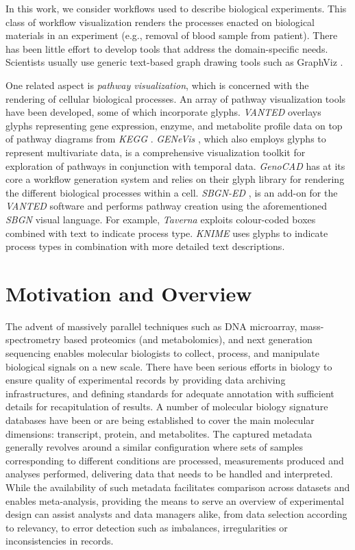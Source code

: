 In this work, we consider workflows used to describe biological experiments. 
This class of workflow visualization renders the processes enacted on biological materials in an experiment (e.g., removal of blood sample from patient).
There has been little effort to develop tools that address the domain-specific needs.
Scientists usually use generic text-based graph drawing tools such as GraphViz \cite{GraphViz::2012}.

One related aspect is \emph{pathway visualization}, which is concerned with the rendering of cellular biological processes.
An array of pathway visualization tools have been developed, some of which incorporate glyphs.
\emph{VANTED} \cite{junker06} overlays glyphs representing gene expression, enzyme, and metabolite profile data on top of pathway diagrams from \emph{KEGG} \cite{ogata99}.
\emph{GENeVis} \cite{bourqui09}, which also employs glyphs to represent multivariate data, is a comprehensive visualization toolkit for exploration of pathways in conjunction with temporal data.
\emph{GenoCAD} \cite{cai10}  has at its core a workflow generation system and relies on their glyph library for rendering the different biological processes within a cell.
\emph{SBGN-ED} \cite{czauderna10}, is an add-on for the \emph{VANTED} software and performs pathway creation using the aforementioned \emph{SBGN} \cite{lenovere09} visual language.
For example, \emph{Taverna} \cite{missier10} exploits colour-coded boxes combined with text to indicate process type.
\emph{KNIME} \cite{berthold08} uses glyphs to indicate process types in combination with more detailed text descriptions.



\section{Motivation and Overview}
\label{sec:Motivation}
%
The advent of massively parallel techniques such as DNA microarray, mass-spectrometry based proteomics (and metabolomics), and next generation sequencing enables molecular biologists to collect, process, and manipulate biological signals on a new scale.
There have been serious efforts in biology to ensure quality of experimental records by providing data archiving infrastructures, and defining standards for adequate annotation with sufficient details for recapitulation of results.
A number of molecular biology signature databases have been or are being established to cover the main molecular dimensions: transcript, protein, and metabolites.
The captured metadata generally revolves around a similar configuration where sets of samples corresponding to different conditions are processed, measurements produced and analyses performed, delivering data that needs to be handled and interpreted.
While the availability of such metadata facilitates comparison across datasets and enables meta-analysis, providing the means to serve an overview of experimental design can assist analysts and data managers alike, from data selection according to relevancy, to error detection such as imbalances, irregularities or inconsistencies in records.

